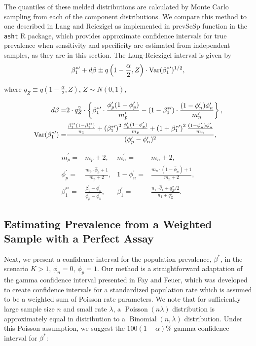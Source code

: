 The quantiles of these melded distributions are calculated by Monte Carlo sampling from each of the component distributions.
We compare this method to one described in Lang and Reiczigel\cite{Lang:2014} as implemented in prevSeSp function in the \texttt{asht} R package,\cite{asht} which provides approximate confidence intervals for true prevalence when sensitivity and specificity are estimated from independent samples, as they are in this section.
The Lang-Reiczigel interval is given by
\begin{equation}
\beta_1^{*\prime} + d\beta \pm q\left( 1 - \frac{\alpha}{2}, Z \right) \cdot \operatorname{Var}(\beta_1^{*\prime})^{1/2},
\end{equation}

where \( q_Z \equiv q\left( 1 - \frac{\alpha}{2}, Z \right)\), \( Z \sim N(0,1) \),

\begin{align*}
    d\beta =& 2 \cdot q_Z^2 \cdot\left\{ \beta_1^{*\prime} \cdot \frac{\phi_p^\prime (1 - \phi_p^\prime)}{m_p^\prime} - (1 - \beta_1^{*\prime}) \cdot \frac{(1 - \phi_n^\prime) \phi_n^\prime}{m_n^\prime} \right\},\\
    \operatorname{Var}(\beta_1^{*\prime}) =& \frac{ \frac{\beta_1^{*\prime}(1 - \beta_1^{*\prime})}{n_1} + \left(\beta_1^{*\prime}\right)^2 \frac{\phi_p^\prime (1 - \phi_p^\prime)}{m_p} + \left(1 + \beta_1^{*\prime}\right)^2 \frac{(1 - \phi_n^\prime) \phi_n^\prime}{ m_n}}{(\phi_p^\prime - \phi_n^\prime)^2},
\end{align*}

\begin{align*}
    m_p^\prime =& m_p +2, &
    m_n^\prime =& m_n + 2, \\
    \phi_p^\prime =& \frac{m_p \cdot \hat{\phi}_p + 1}{m_p + 2}, &
   1 - \phi_n^\prime =& \frac{m_n \cdot (1 - \hat{\phi}_n) + 1}{m_n + 2}, \\
   \beta_1^{*\prime} =& \frac{\beta_1^\prime - \phi_n^\prime}{\phi_p^\prime - \phi_n^\prime}, &
    \beta_1^\prime =& \frac{n_1 \cdot \hat{\theta}_1 + q_Z^2 / 2}{n_1 + q_Z^2}.
\end{align*}

\subsection{Estimating Prevalence from a Weighted Sample with a Perfect Assay}
\label{ch_3:sec:weight-perfect}

Next, we present a confidence interval for the population prevalence, \( \beta^* \), in the scenario \( K > 1 \), \( \phi_n = 0 \), \( \phi_p = 1 \).
Our method is a straightforward adaptation of the gamma confidence interval presented in Fay and Feuer,\cite{FayF:1997} which was developed to create confidence intervals for a standardized population rate which is assumed to be a weighted sum of Poisson rate parameters.
We note that for sufficiently large sample size \( n \) and small rate \( \lambda \), a \( \operatorname{Poisson}(n\lambda) \) distribution is approximately equal in distribution to a \( \operatorname{Binomial}(n, \lambda) \) distribution.
Under this Poisson assumption, we suggest the \( 100(1 - \alpha) \)\% gamma confidence interval for \( \beta^* \):

